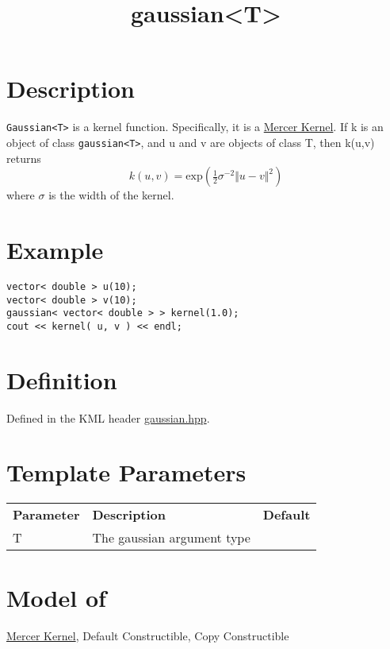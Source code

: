 \documentclass{article}
\newcommand{\half}{\tfrac{1}{2}}
\begin{document}
\title{gaussian<T>}
\maketitle

\section*{Description}

\texttt{Gaussian<T>} is a kernel function. Specifically, it is a \href{research/kml/documentation/mercer_kernel.html}{Mercer Kernel}. If k is an object of class \texttt{gaussian<T>}, and u and v are objects of class T, then k(u,v) returns
%
$$k(u,v) = \textrm{exp}( \half \sigma^{-2} \Vert u-v \Vert^2 ) $$
%
where $\sigma$ is the width of the kernel. 


\section*{Example}


\highlightcpp{}
\begin{verbatim}
vector< double > u(10);
vector< double > v(10);
gaussian< vector< double > > kernel(1.0);
cout << kernel( u, v ) << endl;
\end{verbatim}


\section*{Definition}

Defined in the KML header \href{gaussian.hpp}{gaussian.hpp}.


\section*{Template Parameters}

\begin{tabular}{lll}
\textbf{Parameter} & \textbf{Description} & \textbf{Default} \\ 
T & The gaussian argument type \\ 
\end{tabular}


\section*{Model of}

\href{research/kml/documentation/mercer_kernel.html}{Mercer Kernel}, 
Default Constructible, Copy Constructible
\end{document}
